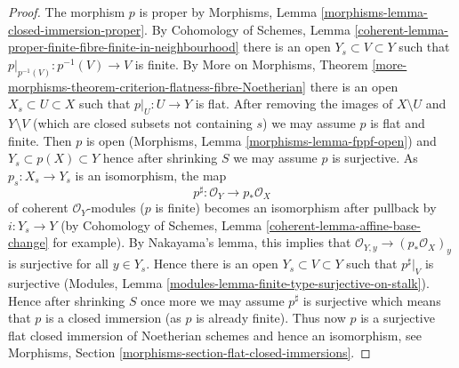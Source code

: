 \documentclass{stacks-project}
\theoremstyle{plain}
\theoremstyle{definition}
\theoremstyle{remark}
\numberwithin{equation}{subsection}
\begin{document}
\begin{proof}
The morphism $p$ is proper by Morphisms, Lemma
\ref{morphisms-lemma-closed-immersion-proper}.
By Cohomology of Schemes, Lemma
\ref{coherent-lemma-proper-finite-fibre-finite-in-neighbourhood}
there is an open $Y_s \subset V \subset Y$ such that
$p|_{p^{-1}(V)} : p^{-1}(V) \to V$ is finite.
By More on Morphisms, Theorem
\ref{more-morphisms-theorem-criterion-flatness-fibre-Noetherian}
there is an open $X_s \subset U \subset X$ such that
$p|_U : U \to Y$ is flat. After removing the images of
$X \setminus U$ and $Y \setminus V$ (which are closed subsets
not containing $s$) we may assume $p$ is flat and finite.
Then $p$ is open (Morphisms, Lemma \ref{morphisms-lemma-fppf-open})
and $Y_s \subset p(X) \subset Y$ hence after shrinking $S$
we may assume $p$ is surjective.
As $p_s : X_s \to Y_s$ is an isomorphism, the map
$$
p^\sharp : \mathcal{O}_Y \longrightarrow p_*\mathcal{O}_X
$$
of coherent $\mathcal{O}_Y$-modules ($p$ is finite)
becomes an isomorphism after pullback by $i : Y_s \to Y$
(by Cohomology of Schemes, Lemma
\ref{coherent-lemma-affine-base-change} for example).
By Nakayama's lemma, this implies that
$\mathcal{O}_{Y, y} \to (p_*\mathcal{O}_X)_y$ is surjective
for all $y \in Y_s$. Hence there is an open $Y_s \subset V \subset Y$
such that $p^\sharp|_V$ is surjective
(Modules, Lemma \ref{modules-lemma-finite-type-surjective-on-stalk}).
Hence after shrinking $S$ once more we may assume
$p^\sharp$ is surjective which means that $p$ is a closed
immersion (as $p$ is already finite).
Thus now $p$ is a surjective flat closed immersion
of Noetherian schemes and hence an isomorphism, see
Morphisms, Section \ref{morphisms-section-flat-closed-immersions}.
\end{proof}
\end{document}
